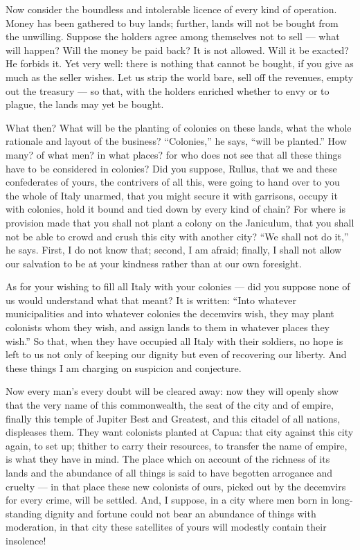 Now consider the boundless and intolerable licence of every kind of operation. Money has been gathered to buy lands; further, lands will not be bought from the unwilling. Suppose the holders agree among themselves not to sell --- what will happen? Will the money be paid back? It is not allowed. Will it be exacted? He forbids it. Yet very well: there is nothing that cannot be bought, if you give as much as the seller wishes. Let us strip the world bare, sell off the revenues, empty out the treasury --- so that, with the holders enriched whether to envy or to plague, the lands may yet be bought.

 What then? What will be the planting of colonies on these lands, what the whole rationale and layout of the business? ``Colonies,'' he says, ``will be planted.'' How many? of what men? in what places? for who does not see that all these things have to be considered in colonies? Did you suppose, Rullus, that we and these confederates of yours, the contrivers of all this, were going to hand over to you the whole of Italy unarmed, that you might secure it with garrisons, occupy it with colonies, hold it bound and tied down by every kind of chain? For where is provision made that you shall not plant a colony on the Janiculum, that you shall not be able to crowd and crush this city with another city? ``We shall not do it,'' he says. First, I do not know that; second, I am afraid; finally, I shall not allow our salvation to be at your kindness rather than at our own foresight.

 As for your wishing to fill all Italy with your colonies --- did you suppose none of us would understand what that meant? It is written: ``Into whatever municipalities and into whatever colonies the decemvirs wish, they may plant colonists whom they wish, and assign lands to them in whatever places they wish.'' So that, when they have occupied all Italy with their soldiers, no hope is left to us not only of keeping our dignity but even of recovering our liberty. And these things I am charging on suspicion and conjecture.

 Now every man's every doubt will be cleared away: now they will openly show that the very name of this commonwealth, the seat of the city and of empire, finally this temple of Jupiter Best and Greatest, and this citadel of all nations, displeases them. They want colonists planted at Capua: that city against this city again, to set up; thither to carry their resources, to transfer the name of empire, is what they have in mind. The place which on account of the richness of its lands and the abundance of all things is said to have begotten arrogance and cruelty --- in that place these new colonists of ours, picked out by the decemvirs for every crime, will be settled. And, I suppose, in a city where men born in long-standing dignity and fortune could not bear an abundance of things with moderation, in that city these satellites of yours will modestly contain their insolence!

